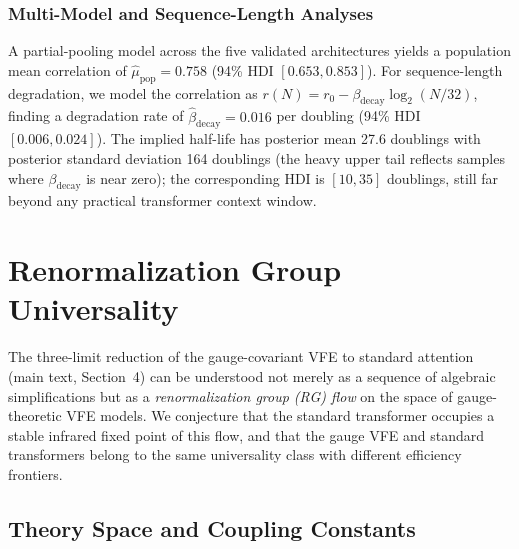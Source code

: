 \documentclass[twoside,11pt]{article}
\begin{document}
\subsubsection{Multi-Model and Sequence-Length Analyses}

A partial-pooling model across the five validated architectures yields a population mean correlation of $\hat{\mu}_{\mathrm{pop}} = 0.758$ (94\% HDI $[0.653, 0.853]$). For sequence-length degradation, we model the correlation as $r(N) = r_0 - \beta_{\mathrm{decay}} \log_2(N/32)$, finding a degradation rate of $\hat{\beta}_{\mathrm{decay}} = 0.016$ per doubling (94\% HDI $[0.006, 0.024]$). The implied half-life has posterior mean 27.6 doublings with posterior standard deviation 164 doublings (the heavy upper tail reflects samples where $\beta_{\mathrm{decay}}$ is near zero); the corresponding HDI is $[10, 35]$ doublings, still far beyond any practical transformer context window.


\section{Renormalization Group Universality}
\label{app:rg_universality}

The three-limit reduction of the gauge-covariant VFE to standard attention (main text, Section~4) can be understood not merely as a sequence of algebraic simplifications but as a \emph{renormalization group (RG) flow} on the space of gauge-theoretic VFE models. We conjecture that the standard transformer occupies a stable infrared fixed point of this flow, and that the gauge VFE and standard transformers belong to the same universality class with different efficiency frontiers.

\subsection{Theory Space and Coupling Constants}
\end{document}
